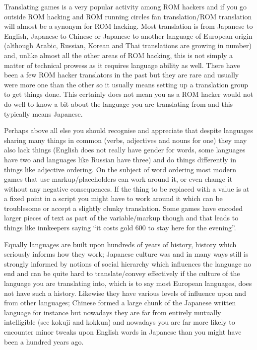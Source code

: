 \documentclass[
]{book}
\begin{document}
Translating games is a very popular activity among ROM hackers and if you go outside ROM hacking and ROM running circles fan translation/ROM translation will almost be a synonym for ROM hacking. Most translation is from Japanese to English, Japanese to Chinese or Japanese to another language of European origin (although Arabic, Russian, Korean and Thai translations are growing in number) and, unlike almost all the other areas of ROM hacking, this is not simply a matter of technical prowess as it requires language ability as well. There have been a few ROM hacker translators in the past but they are rare and usually were more one than the other so it usually means setting up a translation group to get things done. This certainly does not mean you as a ROM hacker would not do well to know a bit about the language you are translating from and this typically means Japanese.

Perhaps above all else you should recognise and appreciate that despite languages sharing many things in common (verbs, adjectives and nouns for one) they may also lack things (English does not really have gender for words, some languages have two and languages like Russian have three) and do things differently in things like adjective ordering. On the subject of word ordering most modern games that use markup/placeholders can work around it, or even change it without any negative consequences. If the thing to be replaced with a value is at a fixed point in a script you might have to work around it which can be troublesome or accept a slightly clunky translation. Some games have encoded larger pieces of text as part of the variable/markup though and that leads to things like innkeepers saying ``it costs gold 600 to stay here for the evening''.

Equally languages are built upon hundreds of years of history, history which seriously informs how they work; Japanese culture was and in many ways still is strongly informed by notions of social hierarchy which influences the language no end and can be quite hard to translate/convey effectively if the culture of the language you are translating into, which is to say most European languages, does not have such a history. Likewise they have various levels of influence upon and from other languages; Chinese formed a large chunk of the Japanese written language for instance but nowadays they are far from entirely mutually intelligible (see kokuji and kokkun) and nowadays you are far more likely to encounter minor tweaks upon English words in Japanese than you might have been a hundred years ago.
\end{document}

